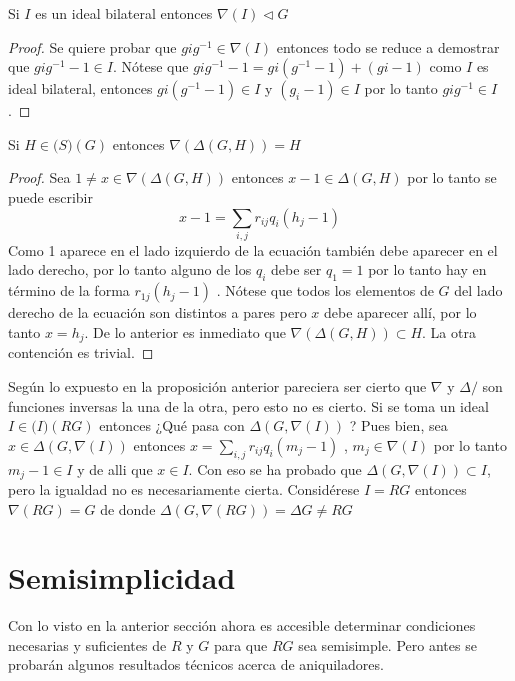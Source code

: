 \begin{lema}
Si $I$ es un ideal bilateral entonces $\nabla(I) \lhd G$
\end{lema}

\begin{proof}
Se quiere probar que $gig^{-1} \in \nabla(I)$ entonces todo se reduce a demostrar que $gig^{-1} -1 \in I$. Nótese que $gig^{-1}-1 = gi(g^{-1}-1)+(gi-1) $ como $I$ es ideal bilateral, entonces $gi(g^{-1}-1) \in I$ y $(g_i-1) \in I$  por lo tanto $gig^{-1} \in I$. \qedhere
\end{proof}


\begin{proposicion}
Si $H \in \mathcal(S)(G)$ entonces $\nabla(\Delta(G,H)) = H$ 
\end{proposicion}

\begin{proof}
Sea $1 \neq x \in \nabla(\Delta(G,H))$ entonces $x-1 \in \Delta(G,H)$ por lo tanto se puede escribir 
$$x-1 = \sum_{i,j}r_{ij}q_i(h_j-1)$$
Como 1 aparece en el lado izquierdo de la ecuación también debe aparecer en el lado derecho, por lo tanto alguno de los $q_i$ debe ser $q_1=1$ por lo tanto hay en término de la forma $r_{1j}(h_j-1)$ . Nótese que todos los elementos de $G$ del lado derecho de la ecuación son distintos a pares pero $x$ debe aparecer allí, por lo tanto $x = h_j$. De lo anterior es inmediato que $\nabla(\Delta(G,H)) \subset H$. La otra contención es trivial. \qedhere
\end{proof}

Según lo expuesto en la proposición anterior pareciera ser cierto que $\nabla$ y $\Delta/$ son funciones inversas la una de la otra, pero esto no es cierto. 
Si se toma un ideal $I \in \mathcal(I)(RG)$ entonces ¿Qué pasa con $\Delta(G,\nabla(I))$ ? Pues bien, sea $x \in \Delta(G, \nabla (I))$ entonces $x = \sum_{i,j} r_{ij}q_i(m_j-1)$ , $m_j \in \nabla(I)$ por lo tanto $m_j -1\in I$ y de alli que $x \in I$. Con eso se ha probado que $\Delta(G,\nabla(I)) \subset I$, pero la igualdad no es necesariamente cierta. Considérese $I=RG$ entonces $\nabla(RG) = G$ de donde $\Delta (G,\nabla(RG)) = \Delta G \neq RG $



\section{Semisimplicidad}

Con lo visto en la anterior sección ahora es accesible determinar condiciones necesarias y suficientes de $R$ y $G$ para que $RG$ sea semisimple.
Pero antes se probarán algunos resultados técnicos acerca de aniquiladores. 

